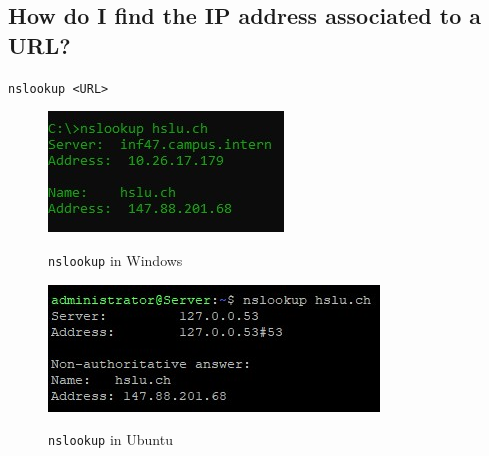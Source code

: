 \subsection*{How do I find the IP address associated to a URL?}
\begin{multicols}{2}
    \texttt{nslookup <URL>}
    \begin{figure}[H]
        \begin{center}
        \label{pic:nslookup_win{Sprungmarke}}
        \includegraphics[width=.5\textwidth]{images/nslookup_win.jpg}
        \caption{\texttt{nslookup} in Windows}
        \end{center}
    \end{figure}
    \columnbreak
    \vfill\null
    \begin{figure}[H]
        \begin{center}
        \label{pic:nslookup_unix}
        \includegraphics[width=.5\textwidth]{images/nslookup_unix.jpg}
        \caption{\texttt{nslookup} in Ubuntu}
        \end{center}
    \end{figure}
\end{multicols}
\pagebreak

